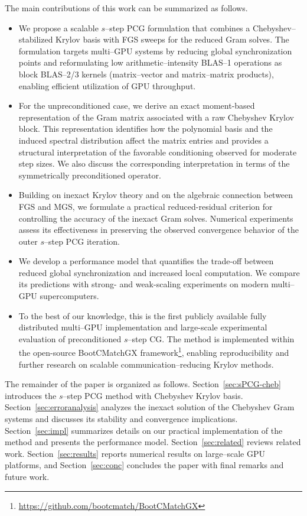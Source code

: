 \documentclass[pdflatex,sn-mathphys-num]{sn-jnl}%
\begin{document}
The main contributions of this work can be summarized as follows.

\begin{itemize}
\item We propose a scalable $s$--step PCG formulation that combines
a Chebyshev--stabilized Krylov basis with FGS sweeps for the reduced
Gram solves. The formulation targets multi--GPU systems by reducing
global synchronization points and reformulating low
arithmetic--intensity BLAS--1 operations as block BLAS--2/3 kernels
(matrix--vector and matrix--matrix products), enabling efficient
utilization of GPU throughput.

\item For the unpreconditioned case, we derive an exact moment-based
representation of the Gram matrix associated with a raw Chebyshev
Krylov block. This representation identifies how the polynomial basis
and the induced spectral distribution affect the matrix entries and
provides a structural interpretation of the favorable conditioning
observed for moderate step sizes. We also discuss the corresponding interpretation in
terms of the symmetrically preconditioned operator.

\item Building on inexact Krylov theory and on the algebraic
connection between FGS and MGS, we formulate a practical
reduced-residual criterion for controlling the accuracy of the
inexact Gram solves. Numerical experiments assess its effectiveness
in preserving the observed convergence behavior of the outer
$s$--step PCG iteration.

\item We develop a performance model that quantifies the trade-off
between reduced global synchronization and increased local
computation. We compare its predictions with strong- and weak-scaling
experiments on modern multi--GPU supercomputers.

\item To the best of our knowledge, this is the first publicly available fully
distributed multi--GPU implementation and large-scale experimental
evaluation of preconditioned $s$--step CG. The method is implemented
within the open-source BootCMatchGX framework\footnote{\url{https://github.com/bootcmatch/BootCMatchGX}}, enabling reproducibility
and further research on scalable communication--reducing Krylov methods.
\end{itemize}

The remainder of the paper is organized as follows.
Section~\ref{sec:sPCG-cheb} introduces the $s$--step PCG method with Chebyshev Krylov basis.
Section~\ref{sec:erroranalysis} analyzes the inexact solution of the Chebyshev Gram systems and discusses its stability and convergence implications.
Section~\ref{sec:impl} summarizes details on our practical implementation of the method and presents the performance model.
Section~\ref{sec:related} reviews related work.
Section~\ref{sec:results} reports numerical results on large--scale GPU platforms, and Section~\ref{sec:conc} concludes the paper with final remarks and future work.
\end{document}
